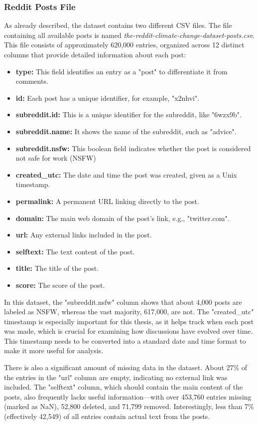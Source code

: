 \subsubsection{Reddit Posts File}
As already described, the dataset contains two different CSV files. The file containing all available posts is named \emph{the-reddit-climate-change-dataset-posts.csv}. This file consists of approximately 620,000 entries, organized across 12 distinct columns that provide detailed information about each post:
\begin{itemize}
    \item \textbf{type:} This field identifies an entry as a "post" to differentiate it from comments.
    \item \textbf{id:} Each post has a unique identifier, for example, "x2nhvi".
    \item \textbf{subreddit.id:} This is a unique identifier for the subreddit, like "6wzx9b".
    \item \textbf{subreddit.name:} It shows the name of the subreddit, such as "advice".
    \item \textbf{subreddit.nsfw:} This boolean field indicates whether the post is considered not safe for work (NSFW)
    \item \textbf{created\_utc:} The date and time the post was created, given as a Unix timestamp.
    \item \textbf{permalink:} A permanent URL linking directly to the post.
    \item \textbf{domain:} The main web domain of the post's link, e.g., "twitter.com".
    \item \textbf{url:} Any external links included in the post.
    \item \textbf{selftext:} The text content of the post.
    \item \textbf{title:} The title of the post.
    \item \textbf{score:} The score of the post.
\end{itemize}
In this dataset, the "subreddit.nsfw" column shows that about 4,000 posts are labeled as NSFW, whereas the vast majority, 617,000, are not. The "created\_utc" timestamp is especially important for this thesis, as it helps track when each post was made, which is crucial for examining how discussions have evolved over time. This timestamp needs to be converted into a standard date and time format to make it more useful for analysis.

There is also a significant amount of missing data in the dataset. About 27\% of the entries in the "url" column are empty, indicating no external link was included. The "selftext" column, which should contain the main content of the posts, also frequently lacks useful information—with over 453,760 entries missing (marked as NaN), 52,800 deleted, and 71,799 removed. Interestingly, less than 7\% (effectively 42,549) of all entries contain actual text from the posts.

